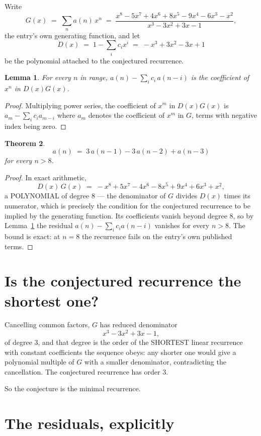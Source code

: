 \documentclass[11pt,a4paper]{article}
\theoremstyle{plain}
\newtheorem{theorem}{Theorem}
\newtheorem{lemma}[theorem]{Lemma}
\theoremstyle{definition}
\begin{document}
Write
\[
G(x)\;=\;\sum_{n}a(n)\,x^{n}\;=\;\frac{x^{8} - 5 x^{7} + 4 x^{6} + 8 x^{5} - 9 x^{4} - 6 x^{3} - x^{2}}{x^{3} - 3 x^{2} + 3 x - 1},
\]
the entry's own generating function, and let
\[
D(x)\;=\;1-\sum_i c_i x^{i}\;=\;- x^{3} + 3 x^{2} - 3 x + 1
\]
be the polynomial attached to the conjectured recurrence.

\begin{lemma}\label{lem:key}
For every $n$ in range, $a(n)-\sum_i c_i\,a(n-i)$ is the coefficient of $x^{n}$ in
$D(x)G(x)$.
\end{lemma}

\begin{proof}
Multiplying power series, the coefficient of $x^{m}$ in $D(x)G(x)$ is
$a_m-\sum_i c_i a_{m-i}$ where $a_m$ denotes the coefficient of $x^{m}$ in $G$, terms with
negative index being zero.
\end{proof}

\begin{theorem}
\[
a(n)\;=\;3\,a(n-1) - 3\,a(n-2) + a(n-3)
\]
for every $n>8$.
\end{theorem}

\begin{proof}
In exact arithmetic,
\[
D(x)\,G(x)\;=\;- x^{8} + 5 x^{7} - 4 x^{6} - 8 x^{5} + 9 x^{4} + 6 x^{3} + x^{2},
\]
a POLYNOMIAL of degree $8$ --- the denominator of $G$ divides $D(x)$ times its numerator,
which is precisely the condition for the conjectured recurrence to be implied by the
generating function. Its coefficients vanish beyond degree $8$, so by
Lemma~\ref{lem:key} the residual $a(n)-\sum_ic_ia(n-i)$ vanishes for every
$n>8$. The bound is exact: at $n=8$ the recurrence fails on the entry's own published terms.
\end{proof}

\section{Is the conjectured recurrence the shortest one?}

Cancelling common factors, $G$ has reduced denominator
\[
x^{3} - 3 x^{2} + 3 x - 1,
\]
of degree $3$, and that degree is the order of the SHORTEST linear recurrence with
constant coefficients the sequence obeys: any shorter one would give a polynomial multiple of
$G$ with a smaller denominator, contradicting the cancellation. The conjectured recurrence has
order $3$.

So the conjecture is the minimal recurrence.

\section{The residuals, explicitly}
\end{document}
